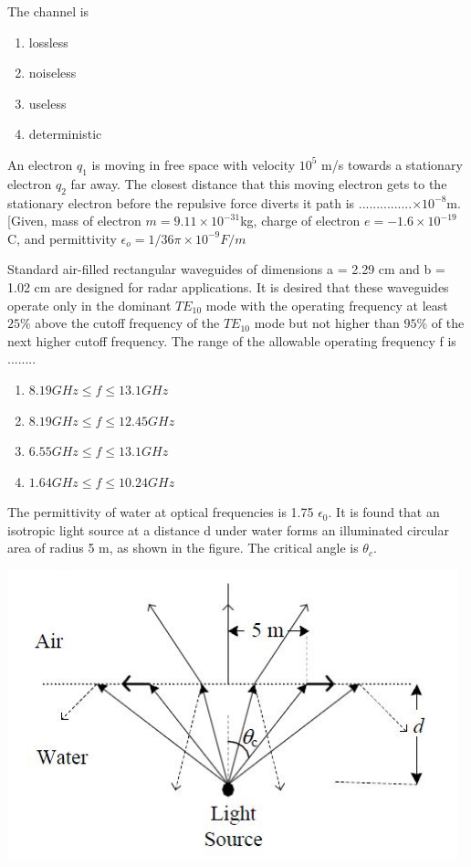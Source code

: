 The channel is
\begin{enumerate}
\item lossless
\item noiseless
\item useless
\item deterministic
\end{enumerate}

\item An electron $q_{1}$ is moving in free space with velocity $10^5$ m/s towards a stationary electron $q_{2}$ far away. The closest distance that this moving electron gets to the stationary electron before the repulsive force diverts it path is ...............$ \times 10^{-8}$m.
[Given, mass of electron $m = 9.11 \times 10^{-31}$kg, charge of electron $e = -1.6 \times 10^{-19}$C, and permittivity
$\epsilon_{o} = 1/36 \pi \times 10^{-9}F/m$ 

\item Standard air-filled rectangular waveguides of dimensions a = 2.29 cm and b = 1.02 cm are designed for radar applications. It is desired that these waveguides operate only in the dominant $TE_{10}$ mode with the operating frequency at least $25 \%$ above the cutoff frequency of the  $TE_{10}$ mode but not higher than $95 \%$ of the next higher cutoff frequency. The range of the allowable operating frequency f is ........
\begin{enumerate}
\item $8.19 GHz \leq f \leq 13.1 GHz$
\item $8.19 GHz \leq f \leq 12.45 GHz$
\item $6.55 GHz \leq f \leq 13.1 GHz$
\item $1.64 GHz \leq f \leq 10.24 GHz$
\end{enumerate}

\item The permittivity of water at optical frequencies is 1.75 $\epsilon_0$. It is found that an isotropic light source at a distance d under water forms an illuminated circular area of radius 5 m, as shown in the figure. The critical angle is 
$\theta_c$.

\includegraphics[scale=0.4]{55}

